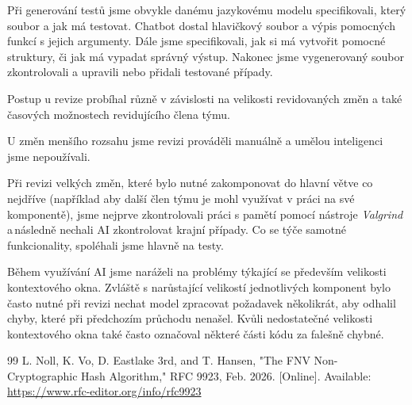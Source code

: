 \documentclass{article}
\begin{document}
        Při generování testů jsme obvykle danému jazykovému modelu specifikovali, který soubor a jak má testovat. Chatbot dostal hlavičkový soubor a výpis pomocných funkcí s jejich argumenty. Dále jsme specifikovali, jak si má vytvořit pomocné struktury, či jak má vypadat správný výstup. Nakonec jsme vygenerovaný soubor zkontrolovali a upravili nebo přidali testované případy.
        
        Postup u revize probíhal různě v závislosti na velikosti revidovaných změn a také časových možnostech revidujícího člena týmu. 
        
        U změn menšího rozsahu jsme revizi prováděli manuálně a umělou inteligenci jsme nepoužívali. 
        
        Při revizi velkých změn, které bylo nutné zakomponovat do hlavní větve co nejdříve (například aby další člen týmu je mohl využívat v práci na své komponentě), jsme nejprve zkontrolovali práci s pamětí pomocí nástroje \textit{Valgrind} a\,následně nechali AI zkontrolovat krajní případy. Co se týče samotné funkcionality, spoléhali jsme hlavně na testy.  

        Během využívání AI jsme naráželi na problémy týkající se především velikosti kontextového okna. Zvláště s narůstající velikostí jednotlivých komponent bylo často nutné při revizi nechat model zpracovat požadavek několikrát, aby odhalil chyby, které při předchozím průchodu nenašel. Kvůli nedostatečné velikosti kontextového okna také často označoval některé části kódu za falešně chybné.

        
        

    \newpage

    
    \def \refname {Převzaté zdroje}
    \begin{thebibliography}{99}
         L. Noll, K. Vo, D. Eastlake 3rd, and T. Hansen, "The FNV Non-Cryptographic Hash Algorithm," RFC 9923, Feb. 2026. [Online]. Available: \mbox{\url{https://www.rfc-editor.org/info/rfc9923}}
    \end{thebibliography}
\end{document}
